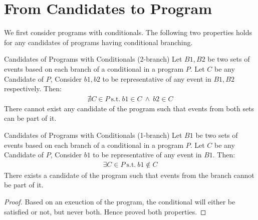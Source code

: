 \section{From Candidates to Program}

    We first consider programs with conditionals. The following two properties holds for any candidates of programs having conditional branching. 

    \begin{property}{Candidates of Programs with Conditionals (2-branch)}
        \label{CondB2}
        Let $B1,B2$ be two sets of events based on each branch of a conditional in a program $P$. Let $C$ be any Candidate of $P$, Consider $b1,b2$ to be representative of any event in $B1,B2$ respectively. Then:
        \begin{align*}
            \nexists C \in P \ \text{s.t.} \ b1 \in C \ \wedge \ b2 \in C 
        \end{align*}
        There cannot exist any candidate of the program such that events from both sets can be part of it. 
    \end{property}

    \begin{property}{Candidates of Programs with Conditionals (1-branch)}
        \label{CondB1}
        Let $B1$ be two sets of events based on each branch of a conditional in a program $P$. Let $C$ be any Candidate of $P$, Consider $b1$ to be representative of any event in $B1$. Then:
        \begin{align*}
            \exists C \in P \ \text{s.t.} \ b1 \notin C  
        \end{align*}
        There exists a candidate of the program such that events from the branch cannot be part of it. 
    \end{property}



    \begin{proof}
        Based on an exeuction of the program, the conditional will either be satisfied or not, but never both. Hence proved both properties. 
    \end{proof}


